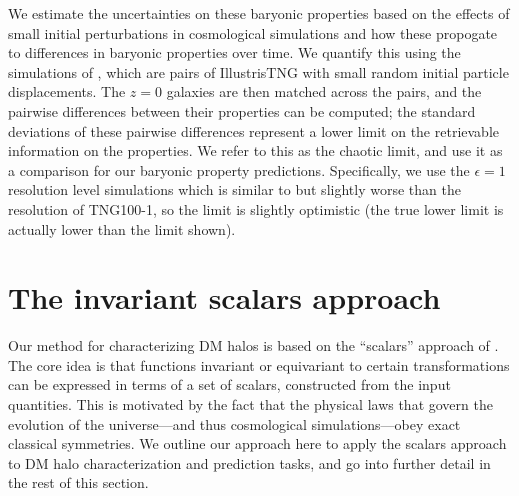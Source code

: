 We estimate the uncertainties on these baryonic properties based on the effects of small initial perturbations in cosmological simulations and how these propogate to differences in baryonic properties over time.
We quantify this using the simulations of \cite{Genel2019}, which are pairs of IllustrisTNG with small random initial particle displacements.
The $z=0$ galaxies are then matched across the pairs, and the pairwise differences between their properties can be computed; the standard deviations of these pairwise differences represent a lower limit on the retrievable information on the properties.
We refer to this as the chaotic limit, and use it as a comparison for our baryonic property predictions.
Specifically, we use the $\epsilon=1$ resolution level simulations which is similar to but slightly worse than the resolution of TNG100-1, so the limit is slightly optimistic (the true lower limit is actually lower than the limit shown).


\section{The invariant scalars approach}
\label{sec:scalars_approach}

Our method for characterizing DM halos is based on the ``scalars'' approach of \cite{Villar2021a}.
The core idea is that functions invariant or equivariant to certain transformations can be expressed in terms of a set of scalars, constructed from the input quantities.  
This is motivated by the fact that the physical laws that govern the evolution of the universe---and thus cosmological simulations---obey exact classical symmetries.
We outline our approach here to apply the scalars approach to DM halo characterization and prediction tasks, and go into further detail in the rest of this section.

